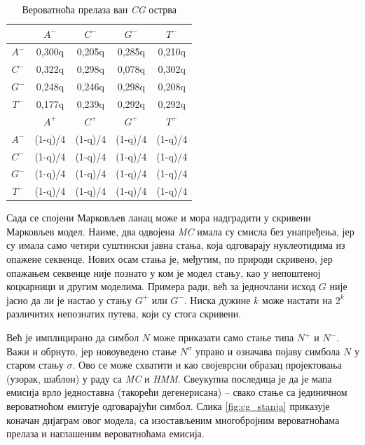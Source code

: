 \documentclass[12pt,oneside]{memoir}
\begin{document}
\begin{CJK}{UTF8}{ipxm}
\begin{table}[h!]
  \centering
  \caption{Вероватноћа прелаза ван \textit{CG} острва}
  \begin{tabular}{| c | c c c c |} \hline
   & $A^-$ & $C^-$ & $G^-$ & $T^-$ \\ \hline
  $A^-$ & 0,300q & 0,205q & 0,285q & 0,210q \\
  $C^-$ & 0,322q & 0,298q & 0,078q & 0,302q \\
  $G^-$ & 0,248q & 0,246q & 0,298q & 0,208q \\
  $T^-$ & 0,177q & 0,239q & 0,292q & 0,292q \\ \hhline{= | = = = =}
   & $A^+$ & $C^+$ & $G^+$ & $T^+$ \\ \hline
  $A^-$ & (1-q)/4 & (1-q)/4 & (1-q)/4 & (1-q)/4 \\
  $C^-$ & (1-q)/4 & (1-q)/4 & (1-q)/4 & (1-q)/4 \\
  $G^-$ & (1-q)/4 & (1-q)/4 & (1-q)/4 & (1-q)/4 \\
  $T^-$ & (1-q)/4 & (1-q)/4 & (1-q)/4 & (1-q)/4 \\ \hline
  \end{tabular}
  \label{tab:cg_hmm2}
\end{table}

Сада се спојени Марковљев ланац може и мора надградити у скривени Марковљев модел. Наиме, два одвојена \textit{MC} имала су смисла без унапређења, јер су имала само четири суштински јавна стања, која одговарају нуклеотидима из опажене секвенце. Нових осам стања је, међутим, по природи скривено, јер опажањем секвенце није познато у ком је модел стању, као у непоштеној коцкарници и другим моделима. Примера ради, већ за једночлани исход $G$ није јасно да ли је настао у стању $G^+$ или $G^-$. Ниска дужине $k$ може настати на $2^k$ различитих непознатих путева, који су стога скривени.

Већ је имплицирано да симбол $N$ може приказати само стање типа $N^+$ и $N^-$. Важи и обрнуто, јер новоуведено стање $N^\sigma$ управо и означава појаву симбола $N$ у старом стању $\sigma$. Ово се може схватити и као својеврсни образац пројектовања (узорак, шаблон) у раду са \textit{MC} и \textit{HMM}. Свеукупна последица је да је мапа емисија врло једноставна (такорећи дегенерисана) -- свако стање са јединичном вероватноћом емитује одговарајући симбол. Слика \ref{fig:cg_stanja} приказује коначан дијаграм овог модела, са изостављеним многобројним вероватноћама прелаза и наглашеним вероватноћама емисија.


\end{CJK}
\end{document}
